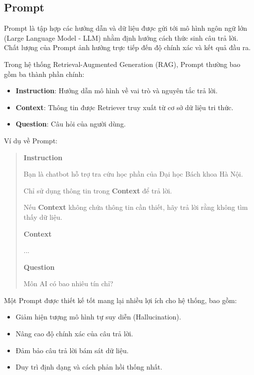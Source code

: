 \documentclass[../DoAn.tex]{subfiles}
\begin{document}
\subsection{Prompt}
Prompt là tập hợp các hướng dẫn và dữ liệu được gửi tới mô hình ngôn ngữ lớn (Large Language Model - LLM) nhằm định hướng cách thức sinh câu trả lời. Chất lượng của Prompt ảnh hưởng trực tiếp đến độ chính xác và kết quả đầu ra.

Trong hệ thống Retrieval-Augmented Generation (RAG), Prompt thường bao gồm ba thành phần chính:

\begin{itemize}
    \item \textbf{Instruction}: Hướng dẫn mô hình về vai trò và nguyên tắc trả lời.
    \item \textbf{Context}: Thông tin được Retriever truy xuất từ cơ sở dữ liệu tri thức.
    \item \textbf{Question}: Câu hỏi của người dùng.
\end{itemize}

\vspace{1cm}
Ví dụ về Prompt:

\begin{quote}
    \textbf{Instruction}

    Bạn là chatbot hỗ trợ tra cứu học phần của Đại học Bách khoa Hà Nội.

    Chỉ sử dụng thông tin trong \textbf{Context} để trả lời.

    Nếu \textbf{Context} không chứa thông tin cần thiết, hãy trả lời rằng không tìm thấy dữ liệu.

    \medskip

    \textbf{Context}

    ...

    \medskip

    \textbf{Question}

    Môn AI có bao nhiêu tín chỉ?
\end{quote}

Một Prompt được thiết kế tốt mang lại nhiều lợi ích cho hệ thống, bao gồm:

\begin{itemize}
    \item Giảm hiện tượng mô hình tự suy diễn (Hallucination).
    \item Nâng cao độ chính xác của câu trả lời.
    \item Đảm bảo câu trả lời bám sát dữ liệu.
    \item Duy trì định dạng và cách phản hồi thống nhất.
\end{itemize}
\end{document}
